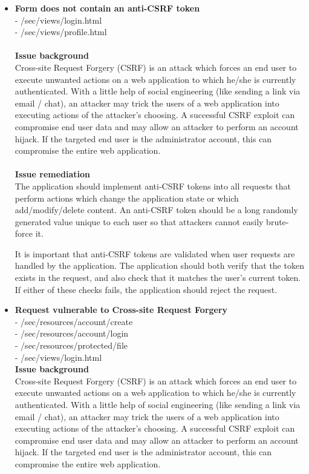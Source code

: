 \begin{itemize}
\item \textbf{Form does not contain an anti-CSRF token}\\
- /sec/views/login.html \\
- /sec/views/profile.html \\ \\
\textbf{Issue background} \\
Cross-site Request Forgery (CSRF) is an attack which forces an end user to execute unwanted actions on a web application to which he/she is currently authenticated. With a little help of social engineering (like sending a link via email / chat), an attacker may trick the users of a web application into executing actions of the attacker's choosing. A successful CSRF exploit can compromise end user data and may allow an attacker to perform an account hijack. If the targeted end user is the administrator account, this can compromise the entire web application.\\ \\

\textbf{Issue remediation} \\
The application should implement anti-CSRF tokens into all requests that perform actions which change the application state or which add/modify/delete content. An anti-CSRF token should be a long randomly generated value unique to each user so that attackers cannot easily brute-force it.

It is important that anti-CSRF tokens are validated when user requests are handled by the application. The application should both verify that the token exists in the request, and also check that it matches the user's current token. If either of these checks fails, the application should reject the request. 

\item \textbf{Request vulnerable to Cross-site Request Forgery} \\
- /sec/resources/account/create \\
- /sec/resources/account/login \\
- /sec/resources/protected/file \\
- /sec/views/login.html \\

\textbf{Issue background} \\
Cross-site Request Forgery (CSRF) is an attack which forces an end user to execute unwanted actions on a web application to which he/she is currently authenticated. With a little help of social engineering (like sending a link via email / chat), an attacker may trick the users of a web application into executing actions of the attacker's choosing. A successful CSRF exploit can compromise end user data and may allow an attacker to perform an account hijack. If the targeted end user is the administrator account, this can compromise the entire web application. \\


\end{itemize}
